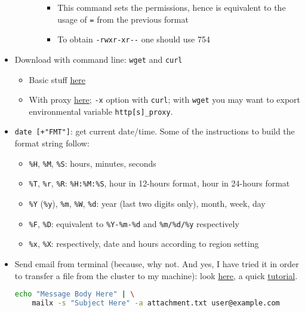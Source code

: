 \documentclass[a4paper,12pt,%
              final%
              ]{article}
\begin{document}
\begin{itemize}
\begin{itemize}
\begin{itemize}
\begin{itemize}
              \item This command sets the permissions, hence is equivalent to the usage of \verb|=| from the previous format
              \item To obtain \verb|-rwxr-xr--| one should use 754
            \end{itemize}
        \end{itemize}
    \end{itemize}
  \item Download with command line: \texttt{wget} and \texttt{curl}
    \begin{itemize}
      \item Basic stuff \href{https://linuxconfig.org/download-file-from-url-on-linux-using-command-line}{here}
      \item With proxy \href{https://www.cyberciti.biz/faq/linux-unix-curl-command-with-proxy-username-password-http-options/}{here}; \verb|-x| option with \texttt{curl}; with \texttt{wget} you may want to export environmental variable \verb|http[s]_proxy|.
    \end{itemize}
  \item \verb|date [+"FMT"]|: get current date/time. Some of the instructions to build the format string follow:
    \begin{itemize}
      \item \verb|%H|, \verb|%M|, \verb|%S|: hours, minutes, seconds
      \item \verb|%T|, \verb|%r|, \verb|%R|: \verb|%H:%M:%S|, hour in 12-hours format, hour in 24-hours format
      \item \verb|%Y| (\verb|%y|), \verb|%m|, \verb|%W|, \verb|%d|: year (last two digits only), month, week, day
      \item \verb|%F|, \verb|%D|: equivalent to \verb|%Y-%m-%d| and \verb|%m/%d/%y| respectively
      \item \verb|%x|, \verb|%X|: respectively, date and hours according to region setting
    \end{itemize}
  \item Send email from terminal (because, why not. And yes, I have tried it in order to transfer a file from the cluster to my machine): look \href{https://www.tecmint.com/send-email-attachment-from-linux-commandline/}{here}, a quick \href{https://www.interserver.net/tips/kb/linux-mail-command-usage-examples/}{tutorial}.
\begin{lstlisting}[language=bash]
echo "Message Body Here" | \
    mailx -s "Subject Here" -a attachment.txt user@example.com

\end{lstlisting}
\end{itemize}
\end{document}
